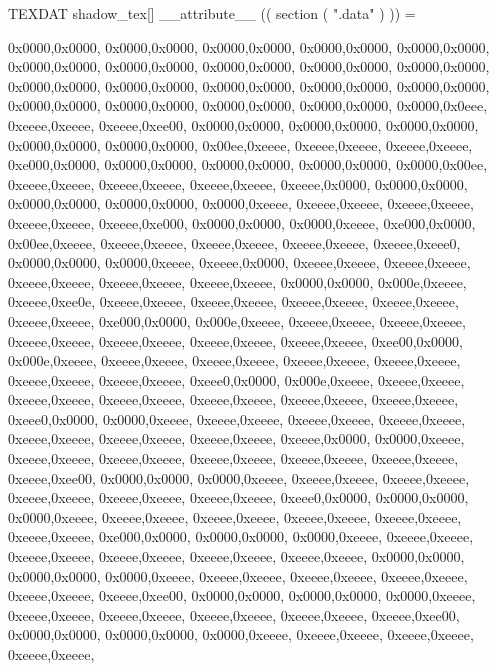 TEXDAT shadow_tex[] __attribute__ (( section ( ".data" ) )) ={

	0x0000,0x0000,
	0x0000,0x0000,
	0x0000,0x0000,
	0x0000,0x0000,
	0x0000,0x0000,
	0x0000,0x0000,
	0x0000,0x0000,
	0x0000,0x0000,
	0x0000,0x0000,
	0x0000,0x0000,
	0x0000,0x0000,
	0x0000,0x0000,
	0x0000,0x0000,
	0x0000,0x0000,
	0x0000,0x0000,
	0x0000,0x0000,
	0x0000,0x0000,
	0x0000,0x0000,
	0x0000,0x0000,
	0x0000,0x0eee,
	0xeeee,0xeeee,
	0xeeee,0xee00,
	0x0000,0x0000,
	0x0000,0x0000,
	0x0000,0x0000,
	0x0000,0x0000,
	0x0000,0x0000,
	0x00ee,0xeeee,
	0xeeee,0xeeee,
	0xeeee,0xeeee,
	0xe000,0x0000,
	0x0000,0x0000,
	0x0000,0x0000,
	0x0000,0x0000,
	0x0000,0x00ee,
	0xeeee,0xeeee,
	0xeeee,0xeeee,
	0xeeee,0xeeee,
	0xeeee,0x0000,
	0x0000,0x0000,
	0x0000,0x0000,
	0x0000,0x0000,
	0x0000,0xeeee,
	0xeeee,0xeeee,
	0xeeee,0xeeee,
	0xeeee,0xeeee,
	0xeeee,0xe000,
	0x0000,0x0000,
	0x0000,0xeeee,
	0xe000,0x0000,
	0x00ee,0xeeee,
	0xeeee,0xeeee,
	0xeeee,0xeeee,
	0xeeee,0xeeee,
	0xeeee,0xeee0,
	0x0000,0x0000,
	0x0000,0xeeee,
	0xeeee,0x0000,
	0xeeee,0xeeee,
	0xeeee,0xeeee,
	0xeeee,0xeeee,
	0xeeee,0xeeee,
	0xeeee,0xeeee,
	0x0000,0x0000,
	0x000e,0xeeee,
	0xeeee,0xee0e,
	0xeeee,0xeeee,
	0xeeee,0xeeee,
	0xeeee,0xeeee,
	0xeeee,0xeeee,
	0xeeee,0xeeee,
	0xe000,0x0000,
	0x000e,0xeeee,
	0xeeee,0xeeee,
	0xeeee,0xeeee,
	0xeeee,0xeeee,
	0xeeee,0xeeee,
	0xeeee,0xeeee,
	0xeeee,0xeeee,
	0xee00,0x0000,
	0x000e,0xeeee,
	0xeeee,0xeeee,
	0xeeee,0xeeee,
	0xeeee,0xeeee,
	0xeeee,0xeeee,
	0xeeee,0xeeee,
	0xeeee,0xeeee,
	0xeee0,0x0000,
	0x000e,0xeeee,
	0xeeee,0xeeee,
	0xeeee,0xeeee,
	0xeeee,0xeeee,
	0xeeee,0xeeee,
	0xeeee,0xeeee,
	0xeeee,0xeeee,
	0xeee0,0x0000,
	0x0000,0xeeee,
	0xeeee,0xeeee,
	0xeeee,0xeeee,
	0xeeee,0xeeee,
	0xeeee,0xeeee,
	0xeeee,0xeeee,
	0xeeee,0xeeee,
	0xeeee,0x0000,
	0x0000,0xeeee,
	0xeeee,0xeeee,
	0xeeee,0xeeee,
	0xeeee,0xeeee,
	0xeeee,0xeeee,
	0xeeee,0xeeee,
	0xeeee,0xee00,
	0x0000,0x0000,
	0x0000,0xeeee,
	0xeeee,0xeeee,
	0xeeee,0xeeee,
	0xeeee,0xeeee,
	0xeeee,0xeeee,
	0xeeee,0xeeee,
	0xeee0,0x0000,
	0x0000,0x0000,
	0x0000,0xeeee,
	0xeeee,0xeeee,
	0xeeee,0xeeee,
	0xeeee,0xeeee,
	0xeeee,0xeeee,
	0xeeee,0xeeee,
	0xe000,0x0000,
	0x0000,0x0000,
	0x0000,0xeeee,
	0xeeee,0xeeee,
	0xeeee,0xeeee,
	0xeeee,0xeeee,
	0xeeee,0xeeee,
	0xeeee,0xeeee,
	0x0000,0x0000,
	0x0000,0x0000,
	0x0000,0xeeee,
	0xeeee,0xeeee,
	0xeeee,0xeeee,
	0xeeee,0xeeee,
	0xeeee,0xeeee,
	0xeeee,0xee00,
	0x0000,0x0000,
	0x0000,0x0000,
	0x0000,0xeeee,
	0xeeee,0xeeee,
	0xeeee,0xeeee,
	0xeeee,0xeeee,
	0xeeee,0xeeee,
	0xeeee,0xee00,
	0x0000,0x0000,
	0x0000,0x0000,
	0x0000,0xeeee,
	0xeeee,0xeeee,
	0xeeee,0xeeee,
	0xeeee,0xeeee,
}

